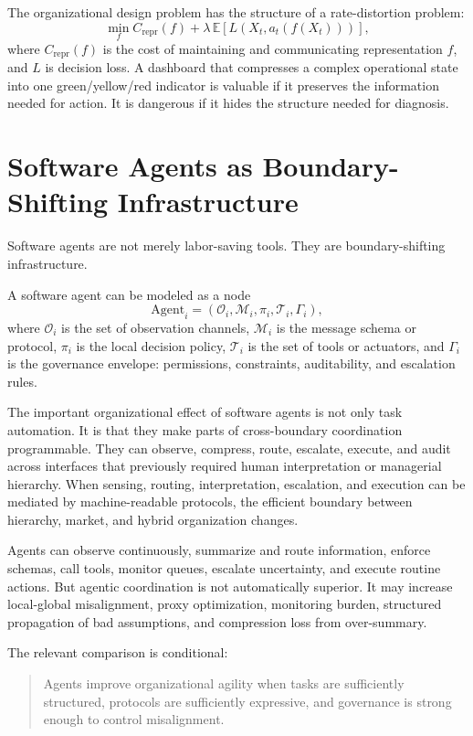 \documentclass[11pt]{article}
\newcommand{\E}{\mathbb{E}}
\newcommand{\calM}{\mathcal{M}}
\newcommand{\calO}{\mathcal{O}}
\newcommand{\calT}{\mathcal{T}}
\begin{document}
The organizational design problem has the structure of a rate-distortion
problem:
\[
\min_f C_{\mathrm{repr}}(f)
+\lambda\,\E[L(X_t,a_t(f(X_t)))],
\]
where \(C_{\mathrm{repr}}(f)\) is the cost of maintaining and communicating
representation \(f\), and \(L\) is decision loss. A dashboard that compresses a
complex operational state into one green/yellow/red indicator is valuable if it
preserves the information needed for action. It is dangerous if it hides the
structure needed for diagnosis.

\section{Software Agents as Boundary-Shifting Infrastructure}

Software agents are not merely labor-saving tools. They are boundary-shifting
infrastructure.

A software agent can be modeled as a node
\[
\mathrm{Agent}_i=(\calO_i,\calM_i,\pi_i,\calT_i,\Gamma_i),
\]
where \(\calO_i\) is the set of observation channels, \(\calM_i\) is the
message schema or protocol, \(\pi_i\) is the local decision policy, \(\calT_i\)
is the set of tools or actuators, and \(\Gamma_i\) is the governance envelope:
permissions, constraints, auditability, and escalation rules.

The important organizational effect of software agents is not only task
automation. It is that they make parts of cross-boundary coordination
programmable. They can observe, compress, route, escalate, execute, and audit
across interfaces that previously required human interpretation or managerial
hierarchy. When sensing, routing, interpretation, escalation, and execution can
be mediated by machine-readable protocols, the efficient boundary between
hierarchy, market, and hybrid organization changes.

Agents can observe continuously, summarize and route information, enforce
schemas, call tools, monitor queues, escalate uncertainty, and execute routine
actions. But agentic coordination is not automatically superior. It may
increase local-global misalignment, proxy optimization, monitoring burden,
structured propagation of bad assumptions, and compression loss from
over-summary.

The relevant comparison is conditional:

\begin{quote}
Agents improve organizational agility when tasks are sufficiently structured,
protocols are sufficiently expressive, and governance is strong enough to
control misalignment.
\end{quote}
\end{document}
